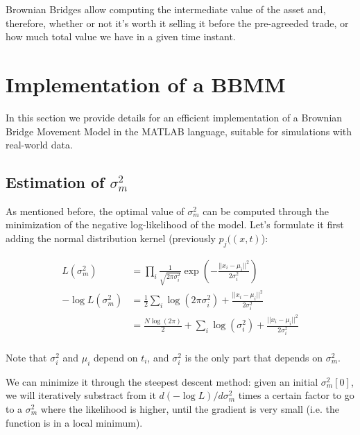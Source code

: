 \documentclass[12pt]{article}
\begin{document}
Brownian Bridges allow computing the intermediate value of the asset and, therefore, whether or not it's worth it selling it before the pre-agreeded trade, or how much total value we have in a given time instant.


\clearpage
\section{Implementation of a BBMM}

In this section we provide details for an efficient implementation of a Brownian Bridge Movement Model in the MATLAB language, suitable for simulations with real-world data.

\subsection{Estimation of $\sigma_m^2$}

As mentioned before, the optimal value of $\sigma_m^2$ can be computed through the minimization of the negative log-likelihood of the model. Let's formulate it first adding the normal distribution kernel (previously $p_j((x,t)$):

\begin{align*}
    L(\sigma_m^2) &= \prod_i \frac{1}{\sqrt{2\pi\sigma_i^2}} \exp \left( -\frac{||x_i-\mu_i||^2}{2\sigma_i^2} \right) \\
    -\log L(\sigma_m^2) &= \frac{1}{2} \sum_i \log(2\pi\sigma_i^2) + \frac{||x_i-\mu_i||^2}{2\sigma_i^2} \\
    &= \frac{N\log(2\pi)}{2} + \sum_i \log(\sigma_i^2) + \frac{||x_i-\mu_i||^2}{2\sigma_i^2} \\
\end{align*}

Note that $\sigma_i^2$ and $\mu_i$ depend on $t_i$, and $\sigma_i^2$ is the only part that depends on $\sigma_m^2$.

We can minimize it through the steepest descent method: given an initial $\sigma_m^2[0]$, we will iteratively substract from it $d(-\log L)/d\sigma_m^2$ times a certain factor to go to a $\sigma_m^2$ where the likelihood is higher, until the gradient is very small (i.e. the function is in a local minimum).
\end{document}
